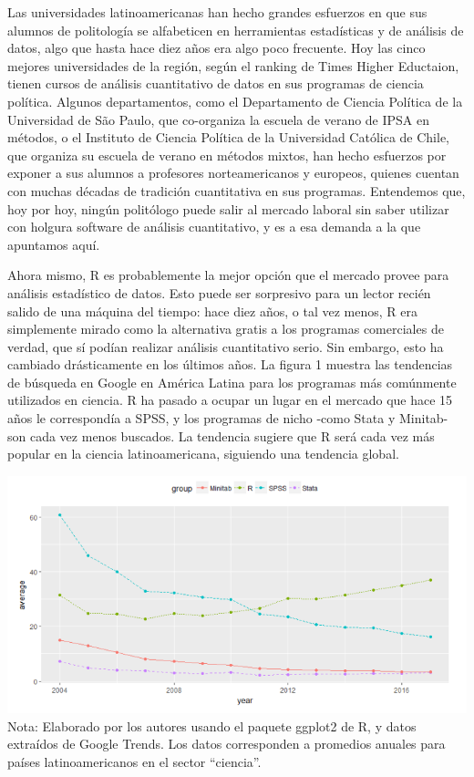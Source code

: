 \documentclass[]{book}
\begin{document}
Las universidades latinoamericanas han hecho grandes esfuerzos en que
sus alumnos de politología se alfabeticen en herramientas estadísticas y
de análisis de datos, algo que hasta hace diez años era algo poco
frecuente. Hoy las cinco mejores universidades de la región, según el
ranking de Times Higher Eductaion, tienen cursos de análisis
cuantitativo de datos en sus programas de ciencia política. Algunos
departamentos, como el Departamento de Ciencia Política de la
Universidad de São Paulo, que co-organiza la escuela de verano de IPSA
en métodos, o el Instituto de Ciencia Política de la Universidad
Católica de Chile, que organiza su escuela de verano en métodos mixtos,
han hecho esfuerzos por exponer a sus alumnos a profesores
norteamericanos y europeos, quienes cuentan con muchas décadas de
tradición cuantitativa en sus programas. Entendemos que, hoy por hoy,
ningún politólogo puede salir al mercado laboral sin saber utilizar con
holgura software de análisis cuantitativo, y es a esa demanda a la que
apuntamos aquí.

Ahora mismo, R es probablemente la mejor opción que el mercado provee
para análisis estadístico de datos. Esto puede ser sorpresivo para un
lector recién salido de una máquina del tiempo: hace diez años, o tal
vez menos, R era simplemente mirado como la alternativa gratis a los
programas comerciales de verdad, que sí podían realizar análisis
cuantitativo serio. Sin embargo, esto ha cambiado drásticamente en los
últimos años. La figura 1 muestra las tendencias de búsqueda en Google
en América Latina para los programas más comúnmente utilizados en
ciencia. R ha pasado a ocupar un lugar en el mercado que hace 15 años le
correspondía a SPSS, y los programas de nicho -como Stata y Minitab- son
cada vez menos buscados. La tendencia sugiere que R será cada vez más
popular en la ciencia latinoamericana, siguiendo una tendencia global.

\includegraphics[width=1.2\linewidth]{images/fig_1_1} Nota: Elaborado
por los autores usando el paquete ggplot2 de R, y datos extraídos de
Google Trends. Los datos corresponden a promedios anuales para países
latinoamericanos en el sector ``ciencia''.
\end{document}
